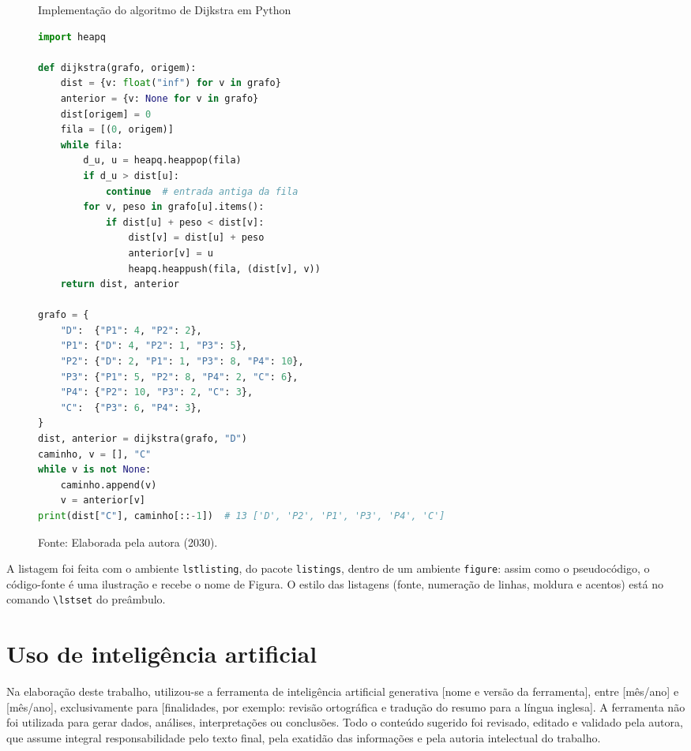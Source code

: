 \documentclass[tese,capa]{texufpel}
\begin{document}
\begin{figure}[htbp]
  \caption{Implementação do algoritmo de Dijkstra em Python}
  \label{fig:codigo}
\begin{lstlisting}[language=Python]
import heapq

def dijkstra(grafo, origem):
    dist = {v: float("inf") for v in grafo}
    anterior = {v: None for v in grafo}
    dist[origem] = 0
    fila = [(0, origem)]
    while fila:
        d_u, u = heapq.heappop(fila)
        if d_u > dist[u]:
            continue  # entrada antiga da fila
        for v, peso in grafo[u].items():
            if dist[u] + peso < dist[v]:
                dist[v] = dist[u] + peso
                anterior[v] = u
                heapq.heappush(fila, (dist[v], v))
    return dist, anterior

grafo = {
    "D":  {"P1": 4, "P2": 2},
    "P1": {"D": 4, "P2": 1, "P3": 5},
    "P2": {"D": 2, "P1": 1, "P3": 8, "P4": 10},
    "P3": {"P1": 5, "P2": 8, "P4": 2, "C": 6},
    "P4": {"P2": 10, "P3": 2, "C": 3},
    "C":  {"P3": 6, "P4": 3},
}
dist, anterior = dijkstra(grafo, "D")
caminho, v = [], "C"
while v is not None:
    caminho.append(v)
    v = anterior[v]
print(dist["C"], caminho[::-1])  # 13 ['D', 'P2', 'P1', 'P3', 'P4', 'C']
\end{lstlisting}
  \caption*{Fonte: Elaborada pela autora (2030).}
\end{figure}

A listagem foi feita com o ambiente \texttt{lstlisting}, do pacote
\texttt{listings}, dentro de um ambiente \texttt{figure}: assim como o
pseudocódigo, o código-fonte é uma ilustração e recebe o nome de Figura. O
estilo das listagens (fonte, numeração de linhas, moldura e acentos) está no
comando \verb|\lstset| do preâmbulo.

\section{Uso de inteligência artificial}

Na elaboração deste trabalho, utilizou-se a ferramenta de inteligência
artificial generativa [nome e versão da ferramenta], entre [mês/ano] e
[mês/ano], exclusivamente para [finalidades, por exemplo: revisão ortográfica
e tradução do resumo para a língua inglesa]. A ferramenta não foi utilizada
para gerar dados, análises, interpretações ou conclusões. Todo o conteúdo
sugerido foi revisado, editado e validado pela autora, que assume integral
responsabilidade pelo texto final, pela exatidão das informações e pela
autoria intelectual do trabalho.
\end{document}
